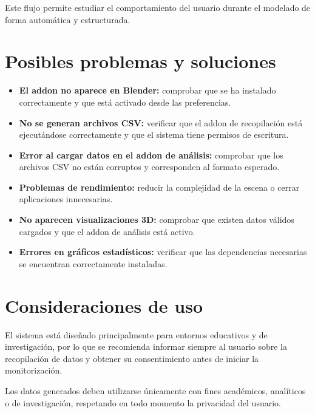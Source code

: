 Este flujo permite estudiar el comportamiento del usuario durante el modelado de forma automática y estructurada.

\section{Posibles problemas y soluciones}

\begin{itemize}

    \item \textbf{El addon no aparece en Blender:} comprobar que se ha instalado correctamente y que está activado desde las preferencias.

    \item \textbf{No se generan archivos CSV:} verificar que el addon de recopilación está ejecutándose correctamente y que el sistema tiene permisos de escritura.

    \item \textbf{Error al cargar datos en el addon de análisis:} comprobar que los archivos CSV no están corruptos y corresponden al formato esperado.

    \item \textbf{Problemas de rendimiento:} reducir la complejidad de la escena o cerrar aplicaciones innecesarias.

    \item \textbf{No aparecen visualizaciones 3D:} comprobar que existen datos válidos cargados y que el addon de análisis está activo.

    \item \textbf{Errores en gráficos estadísticos:} verificar que las dependencias necesarias se encuentran correctamente instaladas.

\end{itemize}

\section{Consideraciones de uso}

El sistema está diseñado principalmente para entornos educativos y de investigación, por lo que se recomienda informar siempre al usuario sobre la recopilación de datos y obtener su consentimiento antes de iniciar la monitorización.

Los datos generados deben utilizarse únicamente con fines académicos, analíticos o de investigación, respetando en todo momento la privacidad del usuario.

